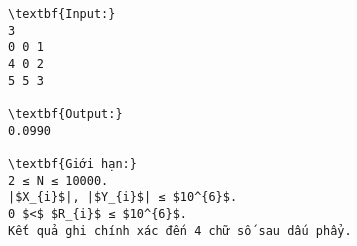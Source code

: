 \begin{verbatim}
\textbf{Input:}
3
0 0 1
4 0 2
5 5 3

\textbf{Output:}
0.0990

\textbf{Giới hạn:}
2 ≤ N ≤ 10000. 
|$X_{i}$|, |$Y_{i}$| ≤ $10^{6}$.
0 $<$ $R_{i}$ ≤ $10^{6}$. 
Kết quả ghi chính xác đến 4 chữ số sau dấu phẩy.
\end{verbatim}